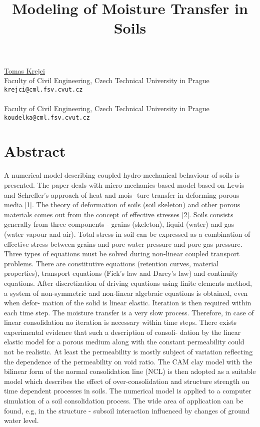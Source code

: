 \title{Modeling of Moisture Transfer in Soils}
 \author{} \institute{}
\maketitle
\begin{center}
{\large \underline{Tomas Krejci}}\\
Faculty of Civil Engineering, Czech Technical University in Prague\\
{\tt krejci@cml.fsv.cvut.cz}
\\ \vspace{4mm}{\large Tomas Koudelka}\\
Faculty of Civil Engineering, Czech Technical University in Prague\\
{\tt koudelka@cml.fsv.cvut.cz}

\end{center}

\section*{Abstract}

A numerical model describing coupled hydro-mechanical behaviour of soils is presented. The paper
deals with micro-mechanics-based model based on Lewis and Schrefler's approach of heat and mois-
ture transfer in deforming porous media [1]. The theory of deformation of soils (soil skeleton) and
other porous materials comes out from the concept of effective stresses [2]. Soils consists generally
from three components - grains (skeleton), liquid (water) and gas (water vapour and air). Total stress
in soil can be expressed as a combination of effective stress between grains and pore water pressure
and pore gas pressure.
Three types of equations must be solved during non-linear coupled transport problems. There
are constitutive equations (retention curves, material properties), transport equations (Fick's law and
Darcy's law) and continuity equations. After discretization of driving equations using finite elements
method, a system of non-symmetric and non-linear algebraic equations is obtained, even when defor-
mation of the solid is linear elastic. Iteration is then required within each time step.
The moisture transfer is a very slow process. Therefore, in case of linear consolidation no iteration
is necessary within time steps. There exists experimental evidence that such a description of consoli-
dation by the linear elastic model for a porous medium along with the constant permeability could not
be realistic. At least the permeability is mostly subject of variation reflecting the dependence of the
permeability on void ratio. The CAM clay model with the bilinear form of the normal consolidation
line (NCL) is then adopted as a suitable model which describes the effect of over-consolidation and
structure strength on time dependent processes in soils.
The numerical model is applied to a computer simulation of a soil consolidation process. The
wide area of application can be found, e.g, in the structure - subsoil interaction influenced by changes
of ground water level.


